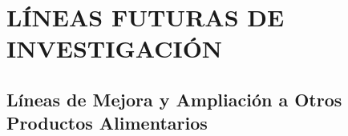 \chapter{LÍNEAS FUTURAS DE INVESTIGACIÓN}\label{ch:lineas}

\section{Líneas de Mejora y Ampliación a Otros Productos Alimentarios}\label{sec:conclusiones-mejora}